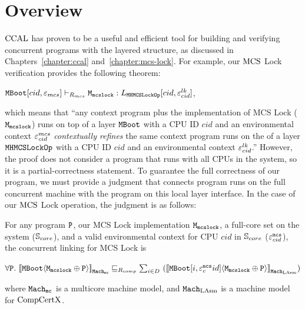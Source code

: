 \section{Overview}
\label{chapter:conlink:sec:overview}



$\mathrm{CCAL}$
has proven to be a useful and efficient tool for building and verifying concurrent programs with the layered structure, as discussed in Chapters~\ref{chapter:ccal} and~\ref{chapter:mcs-lock}.
For example, our $\mathrm{MCS}$ Lock verification provides the following theorem:
\begin{center}
${\mathrm{\texttt{MBoot}}}[cid, {\varepsilon}_{mcs}] \vdash_{R_{mcs}} {\mathrm{\texttt{M}}}_{{\mathrm{\texttt{mcslock}}}} : L_{{\mathrm{\texttt{MHMCSLockOp}}}}[cid, {\varepsilon}^{lk}_{cid}]$,
\end{center}
which means that ``any context program plus the implementation of MCS Lock (${\mathrm{\texttt{M}}}_{{\mathrm{\texttt{mcslock}}}}$) runs on top of 
 a  layer ${\mathrm{\texttt{MBoot}}}$ with a CPU ID $cid$ and an environmental context ${\varepsilon}^{mcs}_{cid}$ \textit{contextually refines}
 the same context program runs on the of a  layer ${\mathrm{\texttt{MHMCSLockOp}}}$ with a CPU ID $cid$ and an environmental context ${\varepsilon}^{lk}_{cid}$.''
However, the proof does not consider a program that runs with all CPUs in the system, 
so it is a partial-correctness statement. 
To guarantee the full correctness of our program, we must provide a judgment that connects program runs on the full concurrent machine with the program on this local layer interface. In the case of our $\mathrm{MCS}$ Lock operation, the judgment is as follows:
\begin{definition}
\label{definition:conlink:con-linking-for-mcs-lock}
For any program $ {\mathrm{\texttt{P}}}$, our MCS Lock implementation ${\mathrm{\texttt{M}}}_{{\mathrm{\texttt{mcslock}}}}$, a full-core set on the system (${\mathbb{S}_{core}}$), and a valid environmental context for CPU  $cid$ in ${\mathbb{S}_{core}}$ (${\varepsilon}^{{\mathrm{\texttt{mcs}}}}_{cid}$), the concurrent linking for MCS Lock is 
\begin{center}
$\forall \codeinmath{P}. \ \semwmachine{\mmcsbootfull}{\codeinmath{M}_{\codeinmath{mcslock}} \oplus \codeinmath{P}}{\hardwarestepkwd} \refines_{R_{comp}} \sum_{i \in D}\  (\semwmachine{\PLayer{\mmcsbootfull}{i}{\oracle^{\codeinmath{mcs}}_cid}}{\codeinmath{M}_{\codeinmath{mcslock}} \oplus \codeinmath{P}}{\lasmmach})$
\end{center}
where  ${{{{\mathrm{\texttt{Mach}}}}_{\mathrm{\texttt{mc}}}}}$ is a multicore machine model, and 
${\mathrm{\texttt{Mach}}}_{\mathrm{LAsm}}$ is a machine model for $\mathrm{CompCertX}$.
\end{definition}

